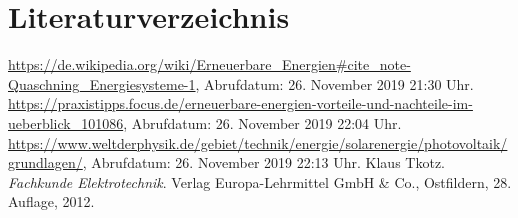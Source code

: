 \section{Literaturverzeichnis}

\begin{thebibliography}{99}
 \url{https://de.wikipedia.org/wiki/Erneuerbare_Energien#cite_note-Quaschning_Energiesysteme-1}, Abrufdatum: 26. November 2019 21:30 Uhr.
 \url{https://praxistipps.focus.de/erneuerbare-energien-vorteile-und-nachteile-im-ueberblick_101086}, Abrufdatum: 26. November 2019 22:04 Uhr.
 \url{https://www.weltderphysik.de/gebiet/technik/energie/solarenergie/photovoltaik/grundlagen/}, Abrufdatum: 26. November 2019 22:13 Uhr.
 Klaus Tkotz. {\itshape Fachkunde Elektrotechnik}. Verlag Europa-Lehrmittel GmbH \& Co., Ostfildern, 28. Auflage, 2012.
\end{thebibliography}